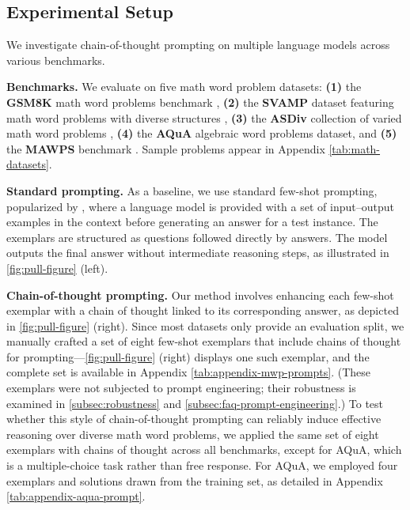\subsection{Experimental Setup}

We investigate chain-of-thought prompting on multiple language models across various benchmarks.

\textbf{Benchmarks.}
We evaluate on five math word problem datasets:
\textbf{(1)} the \textbf{GSM8K} math word problems benchmark \citep{cobbe2021training},
\textbf{(2)} the \textbf{SVAMP} dataset featuring math word problems with diverse structures \citep{patel-etal-2021-nlp},
\textbf{(3)} the \textbf{ASDiv} collection of varied math word problems \citep{miao-etal-2020-diverse},
\textbf{(4)} the \textbf{AQuA} algebraic word problems dataset, and
\textbf{(5)} the \textbf{MAWPS} benchmark \citep{koncel-kedziorski-etal-2016-mawps}. Sample problems appear in Appendix \cref{tab:math-datasets}.

\textbf{Standard prompting.} As a baseline, we use standard few-shot prompting, popularized by \citet{brown2020language}, where a language model is provided with a set of input--output examples in the context before generating an answer for a test instance. The exemplars are structured as questions followed directly by answers. The model outputs the final answer without intermediate reasoning steps, as illustrated in \cref{fig:pull-figure} (left).

\textbf{Chain-of-thought prompting.} Our method involves enhancing each few-shot exemplar with a chain of thought linked to its corresponding answer, as depicted in \cref{fig:pull-figure} (right). Since most datasets only provide an evaluation split, we manually crafted a set of eight few-shot exemplars that include chains of thought for prompting—\cref{fig:pull-figure} (right) displays one such exemplar, and the complete set is available in Appendix \cref{tab:appendix-mwp-prompts}. (These exemplars were not subjected to prompt engineering; their robustness is examined in \cref{subsec:robustness} and \cref{subsec:faq-prompt-engineering}.) To test whether this style of chain-of-thought prompting can reliably induce effective reasoning over diverse math word problems, we applied the same set of eight exemplars with chains of thought across all benchmarks, except for AQuA, which is a multiple-choice task rather than free response. For AQuA, we employed four exemplars and solutions drawn from the training set, as detailed in Appendix \cref{tab:appendix-aqua-prompt}.

